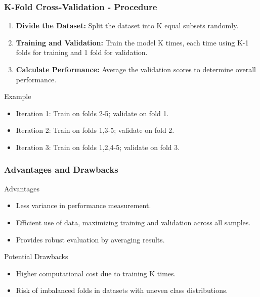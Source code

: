 \documentclass[aspectratio=169]{beamer}
\begin{document}
\begin{frame}[fragile]
    \frametitle{K-Fold Cross-Validation - Procedure}
    \begin{enumerate}
        \item \textbf{Divide the Dataset:} Split the dataset into K equal subsets randomly.
        \item \textbf{Training and Validation:} Train the model K times, each time using K-1 folds for training and 1 fold for validation.
        \item \textbf{Calculate Performance:} Average the validation scores to determine overall performance.
    \end{enumerate}
    \begin{exampleblock}{Example}
        \begin{itemize}
            \item Iteration 1: Train on folds 2-5; validate on fold 1.
            \item Iteration 2: Train on folds 1,3-5; validate on fold 2.
            \item Iteration 3: Train on folds 1,2,4-5; validate on fold 3.
        \end{itemize}
    \end{exampleblock}
\end{frame}

\begin{frame}[fragile]
    \frametitle{Advantages and Drawbacks}
    \begin{block}{Advantages}
        \begin{itemize}
            \item Less variance in performance measurement.
            \item Efficient use of data, maximizing training and validation across all samples.
            \item Provides robust evaluation by averaging results.
        \end{itemize}
    \end{block}

    \begin{block}{Potential Drawbacks}
        \begin{itemize}
            \item Higher computational cost due to training K times.
            \item Risk of imbalanced folds in datasets with uneven class distributions.
        \end{itemize}
    \end{block}
\end{frame}
\end{document}
